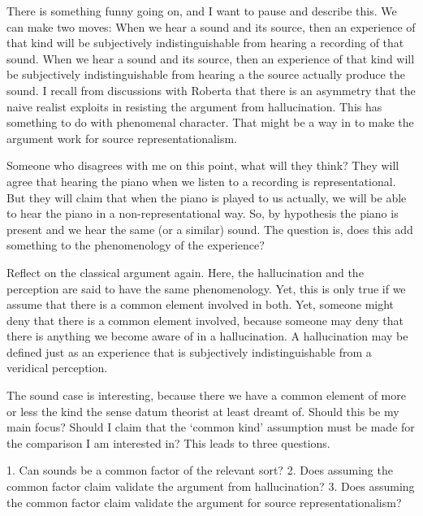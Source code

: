 \documentclass[sloppy, journal, git, bytitle, dodraft]{humapap}
\begin{document}
There is something funny going on, and I want to pause and describe this. We can make two moves: 
When we hear a sound and its source, then an experience of that kind will be subjectively indistinguishable from hearing  a recording of that sound. 
When we hear a sound and its source, then an experience of that kind will be subjectively indistinguishable from hearing a the source actually produce the sound.
I recall from discussions with Roberta that there is an asymmetry that the naive realist exploits in resisting the argument from hallucination. This has something to do with phenomenal character. That might be a way in to make the argument work for source representationalism. 

Someone who disagrees with me on this point, what will they think? They will agree that hearing the piano when we listen to a recording is representational. But they will claim that when the piano is played to us actually, we will be able to hear the piano in a non-representational way. So, by hypothesis the piano is present and we hear the same (or a similar) sound. The question is, does this add something to the phenomenology of the experience? 

Reflect on the classical argument again. Here, the hallucination and the perception are said to have the same phenomenology. Yet, this is only true if we assume that there is a common element involved in both. Yet, someone might deny that there is a common element involved, because someone may deny that there is anything we become aware of in a hallucination. A hallucination may be defined just as an experience that is subjectively indistinguishable from a veridical perception. 

The sound case is interesting, because there we have a common element of more or less the kind the sense datum theorist at least dreamt of. Should this be my main focus? Should I claim that the `common kind' assumption must be made for the comparison I am interested in? This leads to three questions. 

1. Can sounds be a common factor of the relevant sort?
2. Does assuming the common factor claim validate the argument from hallucination? 
3. Does assuming the common factor claim validate the argument for source representationalism? 
 

\sect
\end{document}
